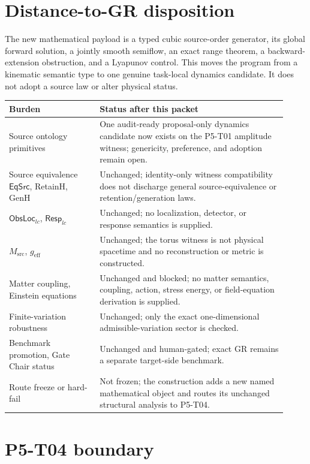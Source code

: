 \documentclass[11pt]{article}
\begin{document}
\section{Distance-to-GR disposition}

The new mathematical payload is a typed cubic source-order generator, its
global forward solution, a jointly smooth semiflow, an exact range theorem, a
backward-extension obstruction, and a Lyapunov control.  This moves the
program from a kinematic semantic type to one genuine task-local dynamics
candidate.  It does not adopt a source law or alter physical status.

\begin{longtable}{p{0.30\linewidth}p{0.62\linewidth}}
\toprule
Burden & Status after this packet\\
\midrule
\endhead
Source ontology primitives &
One audit-ready proposal-only dynamics candidate now exists on the P5-T01
amplitude witness; genericity, preference, and adoption remain open.\\
Source equivalence \(\mathsf{EqSrc}\), RetainH, GenH &
Unchanged; identity-only witness compatibility does not discharge general
source-equivalence or retention/generation laws.\\
\(\mathsf{ObsLoc}_{lc}\), \(\mathsf{Resp}_{lc}\) &
Unchanged; no localization, detector, or response semantics is supplied.\\
\(M_{\mathrm{src}}\), \(g_{\mathrm{eff}}\) &
Unchanged; the torus witness is not physical spacetime and no reconstruction
or metric is constructed.\\
Matter coupling, Einstein equations &
Unchanged and blocked; no matter semantics, coupling, action, stress energy,
or field-equation derivation is supplied.\\
Finite-variation robustness &
Unchanged; only the exact one-dimensional admissible-variation sector is
checked.\\
Benchmark promotion, Gate Chair status &
Unchanged and human-gated; exact GR remains a separate target-side benchmark.\\
Route freeze or hard-fail &
Not frozen; the construction adds a new named mathematical object and routes
its unchanged structural analysis to P5-T04.\\
\bottomrule
\end{longtable}

\section{P5-T04 boundary}
\end{document}
